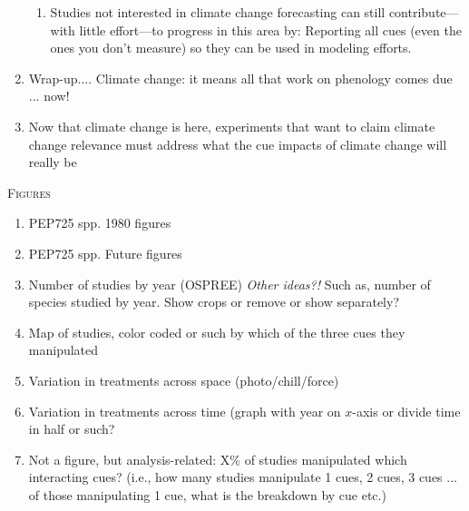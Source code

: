 \documentclass[11pt,letterpaper]{article}
\renewcommand{\section}[1]{%
\bigskip
\begin{center}
\begin{Large}
\normalfont\scshape #1
\medskip
\end{Large}
\end{center}}
\begin{document}
\begin{enumerate}
\begin{enumerate}
\item Studies not interested in climate change forecasting can still contribute---with little effort---to progress in this area by: Reporting all cues (even the ones you don't measure) so they can be used in modeling efforts. 
\end{enumerate}
\item Wrap-up.... Climate change: it means all that work on phenology comes due ... now!
\item Now that climate change is here, experiments that want to claim climate change relevance must address what the cue impacts of climate change will really be
\end{enumerate}



\newpage
\section{Figures}
\begin{enumerate}
\item PEP725 spp. 1980 figures
\item PEP725 spp. Future figures
\item Number of studies by year (OSPREE) \emph{Other ideas?!} Such as, number of species studied by year. Show crops or remove or show separately?
\item Map of studies, color coded or such by which of the three cues they manipulated
\item Variation in treatments across space (photo/chill/force)
\item Variation in treatments across time (graph with year on $x$-axis or divide time in half or such? 
\item Not a figure, but analysis-related: X\% of studies manipulated which interacting cues? (i.e., how many studies manipulate 1 cues, 2 cues, 3 cues ... of those manipulating 1 cue, what is the breakdown by cue etc.)
\end{enumerate}





\end{document}
